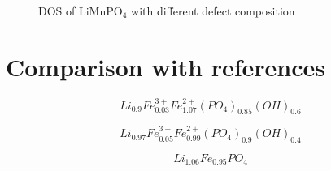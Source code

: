 \begin{figure}[ht]
\vfill
\begin{minipage}[h]{0.5\linewidth}
\end{minipage}
\hfill
\begin{minipage}[ht]{0.5\linewidth}
\end{minipage}
\caption{DOS of LiMnPO$_4$ with different defect composition }
\label{ris:1-4DOS_LMP}
\end{figure}

\section{Comparison with references}

\begin{equation}
Li_{0.9}Fe_{0.03}^{3+}Fe_{1.07}^{2+}(PO_4)_{0.85}(OH)_{0.6}
\end{equation}

\begin{equation}
Li_{0.97}Fe_{0.05}^{3+}Fe_{0.99}^{2+}(PO_4)_{0.9}(OH)_{0.4}
\end{equation}

\begin{equation}
Li_{1.06}Fe_{0.95}PO_4
\end{equation}